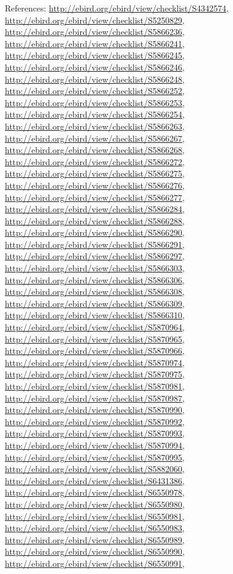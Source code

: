 \documentclass[9pt, article]{memoir}
\begin{document}
\begin{multicols}{2}
References: 
\url{http://ebird.org/ebird/view/checklist/S4342574}, 
\url{http://ebird.org/ebird/view/checklist/S5250829}, 
\url{http://ebird.org/ebird/view/checklist/S5866236}, 
\url{http://ebird.org/ebird/view/checklist/S5866241}, 
\url{http://ebird.org/ebird/view/checklist/S5866245}, 
\url{http://ebird.org/ebird/view/checklist/S5866246}, 
\url{http://ebird.org/ebird/view/checklist/S5866248}, 
\url{http://ebird.org/ebird/view/checklist/S5866252}, 
\url{http://ebird.org/ebird/view/checklist/S5866253}, 
\url{http://ebird.org/ebird/view/checklist/S5866254}, 
\url{http://ebird.org/ebird/view/checklist/S5866263}, 
\url{http://ebird.org/ebird/view/checklist/S5866267}, 
\url{http://ebird.org/ebird/view/checklist/S5866268}, 
\url{http://ebird.org/ebird/view/checklist/S5866272}, 
\url{http://ebird.org/ebird/view/checklist/S5866275}, 
\url{http://ebird.org/ebird/view/checklist/S5866276}, 
\url{http://ebird.org/ebird/view/checklist/S5866277}, 
\url{http://ebird.org/ebird/view/checklist/S5866284}, 
\url{http://ebird.org/ebird/view/checklist/S5866288}, 
\url{http://ebird.org/ebird/view/checklist/S5866290}, 
\url{http://ebird.org/ebird/view/checklist/S5866291}, 
\url{http://ebird.org/ebird/view/checklist/S5866297}, 
\url{http://ebird.org/ebird/view/checklist/S5866303}, 
\url{http://ebird.org/ebird/view/checklist/S5866306}, 
\url{http://ebird.org/ebird/view/checklist/S5866308}, 
\url{http://ebird.org/ebird/view/checklist/S5866309}, 
\url{http://ebird.org/ebird/view/checklist/S5866310}, 
\url{http://ebird.org/ebird/view/checklist/S5870964}, 
\url{http://ebird.org/ebird/view/checklist/S5870965}, 
\url{http://ebird.org/ebird/view/checklist/S5870966}, 
\url{http://ebird.org/ebird/view/checklist/S5870974}, 
\url{http://ebird.org/ebird/view/checklist/S5870975}, 
\url{http://ebird.org/ebird/view/checklist/S5870981}, 
\url{http://ebird.org/ebird/view/checklist/S5870987}, 
\url{http://ebird.org/ebird/view/checklist/S5870990}, 
\url{http://ebird.org/ebird/view/checklist/S5870992}, 
\url{http://ebird.org/ebird/view/checklist/S5870993}, 
\url{http://ebird.org/ebird/view/checklist/S5870994}, 
\url{http://ebird.org/ebird/view/checklist/S5870995}, 
\url{http://ebird.org/ebird/view/checklist/S5882060}, 
\url{http://ebird.org/ebird/view/checklist/S6431386}, 
\url{http://ebird.org/ebird/view/checklist/S6550978}, 
\url{http://ebird.org/ebird/view/checklist/S6550980}, 
\url{http://ebird.org/ebird/view/checklist/S6550981}, 
\url{http://ebird.org/ebird/view/checklist/S6550983}, 
\url{http://ebird.org/ebird/view/checklist/S6550989}, 
\url{http://ebird.org/ebird/view/checklist/S6550990}, 
\url{http://ebird.org/ebird/view/checklist/S6550991}, 

\end{multicols}
\end{document}
